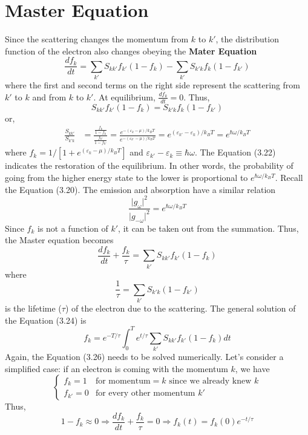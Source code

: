 \section{Master Equation}
Since the scattering changes the momentum from $k$ to $k'$, the distribution function of the electron also changes obeying the {\bf Mater Equation} \begin{equation}
    \frac{df_{k}}{dt} = \sum_{k'}{S_{kk'}f_{k'}(1-f_{k})} - \sum_{k'}{S_{k'k}f_{k}(1-f_{k'})}
\end{equation} where the first and second terms on the right side represent the scattering from $k'$ to $k$ and from $k$ to $k'$. At equilibrium, $\frac{df_{k}}{dt}=0$. Thus, \begin{equation}
    S_{kk'}f_{k'}(1-f_{k}) = S_{k'k}f_{k}(1-f_{k'})\nonumber
\end{equation} or, \begin{align}
    \frac{S_{kk'}}{S_{k'k}}& = \frac{\frac{f_{k}}{1-f_{k}}}{\frac{f_{k'}}{1-f_{k'}}} = \frac{e^{-(\varepsilon_{k}-\mu)/k_{B}T}}{e^{-(\varepsilon_{k'}-\mu)/k_{B}T}} = e^{(\varepsilon_{k'}-\varepsilon_{k})/k_{B}T} = e^{\hbar\omega/k_{B}T}
\end{align} where $f_{k} = 1/[1+e^{(\varepsilon_{k}-\mu)/k_{B}T}]$ and $\varepsilon_{k'}-\varepsilon_{k}\equiv \hbar\omega$. The Equation (3.22) indicates the restoration of the equilibrium. In other words, the probability of going from the higher energy state to the lower is proportional to $e^{\hbar\omega/k_{B}T}$. Recall the Equation (3.20). The emission and absorption have a similar relation \begin{equation}
    \frac{\big|g_{\omega}\big|^{2}}{\big|g_{-\omega}\big|^{2}} = e^{\hbar\omega/k_{B}T}
\end{equation} Since $f_{k}$ is not a function of $k'$, it can be taken out from the summation. Thus, the Master equation becomes \begin{equation}
    \boxed{\frac{df_{k}}{dt} + \frac{f_{k}}{\tau} = \sum_{k'}{S_{kk'}f_{k'}(1-f_{k})}}
\end{equation} where \begin{equation}
    \frac{1}{\tau} = \sum_{k'}{S_{k'k}(1-f_{k'})}
\end{equation} is the lifetime ($\tau$) of the electron due to the scattering. The general solution of the Equation (3.24) is \begin{equation}
    f_{k} = e^{-T/\tau}\int_{0}^{T}e^{t/\tau}\sum_{k'}{S_{kk'}f_{k'}(1-f_{k})}dt
\end{equation} Again, the Equation (3.26) needs to be solved numerically. Let's consider a simplified case: if an electron is coming with the momentum $k$, we have \begin{equation}
    \begin{cases}
    f_{k} = 1 & \text{for momentum$=k$ since we already knew $k$}\\
    f_{k'} = 0 & \text{for every other momentum $k'$}
    \end{cases}
\end{equation} Thus, \begin{equation}
    1-f_{k}\approx 0 \Rightarrow \frac{df_{k}}{dt} + \frac{f_{k}}{\tau} = 0 \Rightarrow f_{k}(t) = f_{k}(0)e^{-t/\tau}
\end{equation}

